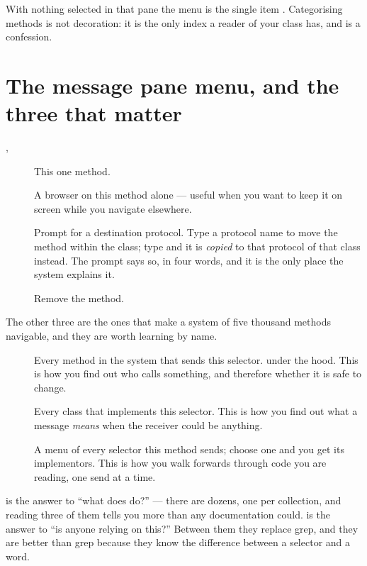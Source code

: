 With nothing selected in that pane the menu is the single item
. Categorising methods is not decoration: it is the only
index a reader of your class has, and  is a
confession.

\section{The message pane menu, and the three that matter}

\begin{description}
\item[, ] This one method.
\item[] A browser on this method alone --- useful when you want to
  keep it on screen while you navigate elsewhere.
\item[] Prompt for a destination protocol. Type a protocol name to
  move the method within the class; type  and it is
  \emph{copied} to that protocol of that class instead. The prompt says so, in
  four words, and it is the only place the system explains it.
\item[] Remove the method.
\end{description}

The other three are the ones that make a system of five thousand methods
navigable, and they are worth learning by name.

\begin{description}
\item[] Every method in the system that sends this selector.
   under the hood. This is how you find out
  who calls something, and therefore whether it is safe to change.
\item[] Every class that implements this selector.
  This is how you find out what a message \emph{means} when the receiver could
  be anything.
\item[] A menu of every selector this method sends; choose one
  and you get its implementors. This is how you walk forwards through code you
  are reading, one send at a time.
\end{description}

\begin{stnote}
 is the answer to ``what does  do?'' --- there are
dozens, one per collection, and reading three of them tells you more than any
documentation could.  is the answer to ``is anyone relying on
this?'' Between them they replace grep, and they are better than grep because
they know the difference between a selector and a word.
\end{stnote}

